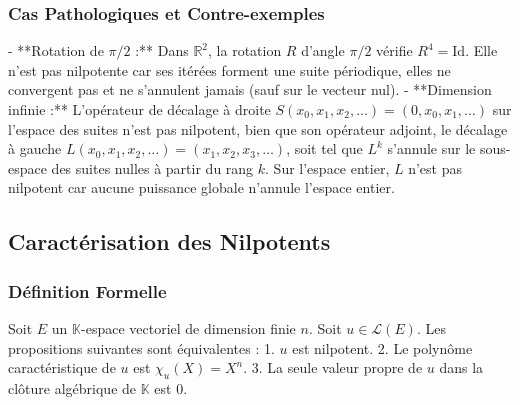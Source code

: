 \documentclass[11pt,a4paper]{article}
\begin{document}
\subsubsection{Cas Pathologiques et Contre-exemples}
- **Rotation de $\pi/2$ :** Dans $\mathbb{R}^2$, la rotation $R$ d'angle $\pi/2$ vérifie $R^4 = \text{Id}$. Elle n'est pas nilpotente car ses itérées forment une suite périodique, elles ne convergent pas et ne s'annulent jamais (sauf sur le vecteur nul).
- **Dimension infinie :** L'opérateur de décalage à droite $S(x_0, x_1, x_2, \dots) = (0, x_0, x_1, \dots)$ sur l'espace des suites n'est pas nilpotent, bien que son opérateur adjoint, le décalage à gauche $L(x_0, x_1, x_2, \dots) = (x_1, x_2, x_3, \dots)$, soit tel que $L^k$ s'annule sur le sous-espace des suites nulles à partir du rang $k$. Sur l'espace entier, $L$ n'est pas nilpotent car aucune puissance globale n'annule l'espace entier.


\begin{center}
\end{center}

\subsection{Caractérisation des Nilpotents}

\subsubsection{Définition Formelle}
Soit $E$ un $\mathbb{K}$-espace vectoriel de dimension finie $n$. Soit $u \in \mathcal{L}(E)$.
Les propositions suivantes sont équivalentes :
1. $u$ est nilpotent.
2. Le polynôme caractéristique de $u$ est $\chi_u(X) = X^n$.
3. La seule valeur propre de $u$ dans la clôture algébrique de $\mathbb{K}$ est $0$.
\end{document}
